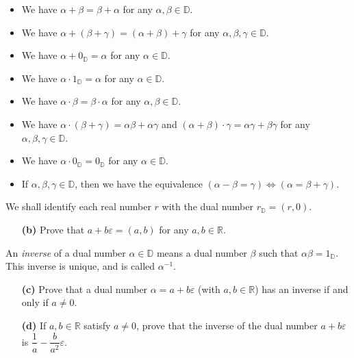 \documentclass[paper=a4, fontsize=12pt]{scrartcl} %
\newcommand{\RR}{\mathbb{R}} %
\newcommand{\DD}{{\mathbb{D}}} %
\newcommand{\tup}[1]{\left( #1 \right)}
\newcommand{\eps}{\varepsilon}
\theoremstyle{plainsl}
\theoremstyle{definition}
\theoremstyle{remark}
\begin{document}
\begin{itemize}

\item We have $\alpha + \beta = \beta + \alpha$
for any $\alpha, \beta \in \DD$.

\item We have $\alpha + \tup{\beta + \gamma}
= \tup{\alpha + \beta} + \gamma$
for any $\alpha, \beta, \gamma \in \DD$.

\item We have $\alpha + 0_\DD = \alpha$
for any $\alpha \in \DD$.

\item We have $\alpha \cdot 1_\DD = \alpha$
for any $\alpha \in \DD$.

\item We have $\alpha \cdot \beta = \beta \cdot \alpha$
for any $\alpha, \beta \in \DD$.

\item We have $\alpha \cdot \tup{\beta + \gamma}
= \alpha \beta + \alpha \gamma$
and $\tup{\alpha + \beta} \cdot \gamma
= \alpha \gamma + \beta \gamma$
for any $\alpha, \beta, \gamma \in \DD$.

\item We have $\alpha \cdot 0_\DD = 0_\DD$
for any $\alpha \in \DD$.

\item If $\alpha, \beta, \gamma \in \DD$,
then we have the equivalence
$\tup{\alpha - \beta = \gamma}
\iff \tup{\alpha = \beta + \gamma}$.
\end{itemize}

We shall identify each real number $r$ with the dual
number $r_\DD = \tup{r, 0}$.

\begin{enumerate}

\item[\textbf{(b)}]
Prove that $a + b\eps = \tup{a, b}$
for any $a, b \in \RR$.

\end{enumerate}

An \textit{inverse} of a dual number
$\alpha \in \DD$ means a dual number $\beta$ such
that $\alpha \beta = 1_\DD$.
This inverse is unique, and is called $\alpha^{-1}$.

\begin{enumerate}

\item[\textbf{(c)}]
Prove that a dual number $\alpha = a + b\eps$
(with $a, b \in \RR$) has an inverse if and only
if $a \neq 0$.

\item[\textbf{(d)}]
If $a, b \in \RR$ satisfy $a \neq 0$, prove
that the inverse of the dual number $a + b\eps$
is $\dfrac{1}{a} - \dfrac{b}{a^2} \eps$.

\end{enumerate}
\end{document}
